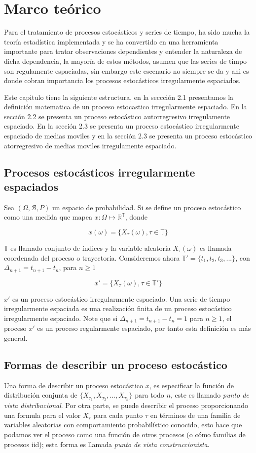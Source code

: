 \chapter{Marco teórico}
Para el tratamiento de procesos estocásticos y series de tiempo, ha sido mucha la teoría estadística implementada y se ha convertido
en una herramienta importante para tratar observaciones dependientes y entender la naturaleza de dicha dependencia,
la mayoría de estos métodos, asumen que las series de timpo son regulamente espaciadas, sin embargo este escenario
no siempre se da y ahi es donde cobran importancia los procesos estocásticos irregularmente espaciados.

Este capitulo tiene la siguiente estructura, en la seccción 2.1 presentamos la definición matematica de un proceso
estocastico irregularmente espaciado. En la sección 2.2 se presenta un proceso estocástico autorregresivo irregulamente
espaciado. En la sección 2.3 se presenta un proceso estocástico irregularmente espaciado de medias moviles y en la sección
2.3 se presenta un proceso estocástico atorregresivo de medias moviles irregulamente espaciado.


\section{Procesos estocásticos irregularmente espaciados}
Sea $(\Omega,\mathscr{B},P)$ un espacio de probabilidad. Si se define un proceso estocástico como una medida 
que mapea $x: \Omega \mapsto \mathbb{R}^{\mathbb{T}}$, donde 

$$x(\omega)= \lbrace X_{\tau}(\omega), \tau \in \mathbb{T}\rbrace$$

$\mathbb{T}$ es llamado conjunto de índices y la variable aleatoria $X_{\tau}(\omega)$ es llamada coordenada 
del proceso o trayectoria. Consideremos ahora $\mathbb{T}'= \lbrace t_1,t_2, t_3,... \rbrace$, 
con $\Delta_{n+1}=t_{n+1}-t_{n}$, para $n\geq 1$

$$x'= \lbrace X_{\tau}(\omega), \tau \in \mathbb{T}'\rbrace$$

$x'$ es un proceso estocástico irregularmente espaciado. Una serie de tiempo irregularmente espaciada es una 
realización finita de un proceso estocástico irregularmente espaciado. Note que si  $\Delta_{n+1}=t_{n+1}-t_{n}=1$ 
para $n \geq 1$, el proceso $x'$ es un proceso regularmente espaciado, por tanto esta definición es más general.

\section{Formas de describir un proceso estocástico}
Una forma de describir un proceso estocástico $x$, es especificar la función de distribución conjunta de 
$\lbrace X_{\tau_1},X_{\tau_2}, ..., X_{\tau_n}\rbrace$ para todo $n$, este es llamado 
\emph{punto de vista distribucional}. Por otra parte, se puede describir el proceso proporcionando 
una formula para el valor $X_{\tau}$ para cada punto $\tau$ en términos de una familia de variables aleatorias 
con comportamiento probabilístico conocido, esto hace que podamos ver el proceso como una función de otros 
procesos (o cómo familias de procesos iid); esta forma es llamada \emph{punto de vista construccionista}.

